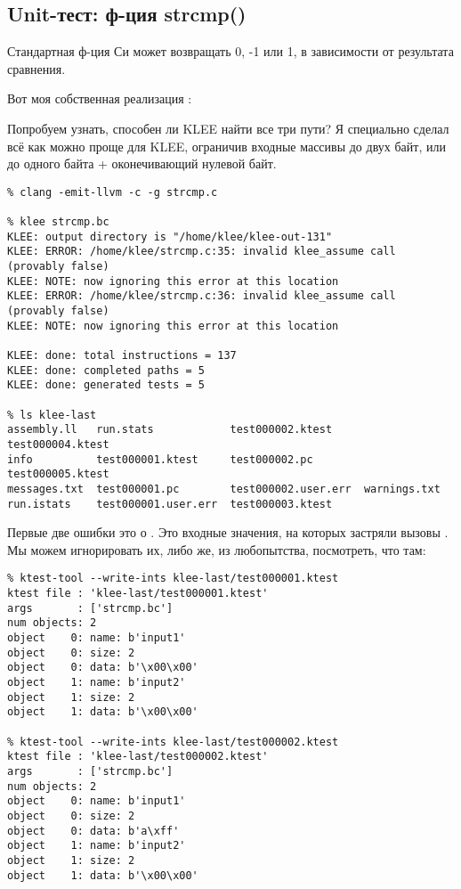\subsection{Unit-тест: ф-ция strcmp()}

Стандартная ф-ция Си  может возвращать 0, -1 или 1, в зависимости от результата сравнения.

Вот моя собственная реализация :



Попробуем узнать, способен ли KLEE найти все три пути?
Я специально сделал всё как можно проще для KLEE, ограничив входные массивы до двух байт, или до одного байта +
оконечивающий нулевой байт.

\begin{lstlisting}
% clang -emit-llvm -c -g strcmp.c

% klee strcmp.bc
KLEE: output directory is "/home/klee/klee-out-131"
KLEE: ERROR: /home/klee/strcmp.c:35: invalid klee_assume call (provably false)
KLEE: NOTE: now ignoring this error at this location
KLEE: ERROR: /home/klee/strcmp.c:36: invalid klee_assume call (provably false)
KLEE: NOTE: now ignoring this error at this location

KLEE: done: total instructions = 137
KLEE: done: completed paths = 5
KLEE: done: generated tests = 5

% ls klee-last
assembly.ll   run.stats            test000002.ktest     test000004.ktest
info          test000001.ktest     test000002.pc        test000005.ktest
messages.txt  test000001.pc        test000002.user.err  warnings.txt
run.istats    test000001.user.err  test000003.ktest
\end{lstlisting}

Первые две ошибки это о .
Это входные значения, на которых застряли вызовы .
Мы можем игнорировать их, либо же, из любопытства, посмотреть, что там:

\begin{lstlisting}
% ktest-tool --write-ints klee-last/test000001.ktest
ktest file : 'klee-last/test000001.ktest'
args       : ['strcmp.bc']
num objects: 2
object    0: name: b'input1'
object    0: size: 2
object    0: data: b'\x00\x00'
object    1: name: b'input2'
object    1: size: 2
object    1: data: b'\x00\x00'

% ktest-tool --write-ints klee-last/test000002.ktest
ktest file : 'klee-last/test000002.ktest'
args       : ['strcmp.bc']
num objects: 2
object    0: name: b'input1'
object    0: size: 2
object    0: data: b'a\xff'
object    1: name: b'input2'
object    1: size: 2
object    1: data: b'\x00\x00'
\end{lstlisting}

